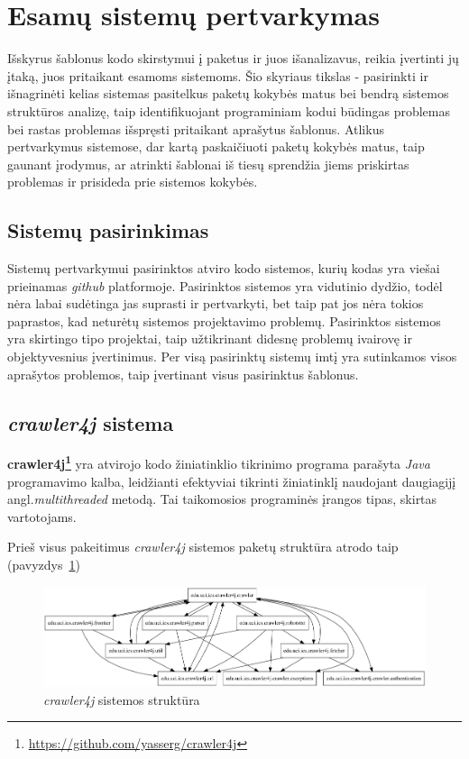 \section{Esamų sistemų pertvarkymas}
Išskyrus šablonus kodo skirstymui į paketus ir juos išanalizavus, reikia įvertinti jų įtaką, juos pritaikant esamoms sistemoms.
Šio skyriaus tikslas - pasirinkti ir išnagrinėti kelias sistemas pasitelkus paketų kokybės matus bei bendrą sistemos struktūros analizę,
taip identifikuojant programiniam kodui būdingas problemas bei rastas problemas išspręsti pritaikant aprašytus šablonus.
Atlikus pertvarkymus sistemose, dar kartą paskaičiuoti paketų kokybės matus,
taip gaunant įrodymus, ar atrinkti šablonai iš tiesų sprendžia
jiems priskirtas problemas ir prisideda prie sistemos kokybės.


\subsection{Sistemų pasirinkimas}
Sistemų pertvarkymui pasirinktos atviro kodo sistemos, kurių kodas yra viešai prieinamas \textit{github} platformoje.
Pasirinktos sistemos yra vidutinio dydžio, todėl nėra labai sudėtinga jas suprasti ir pertvarkyti, bet taip pat jos nėra
tokios paprastos, kad neturėtų sistemos projektavimo problemų.
Pasirinktos sistemos yra skirtingo tipo projektai, taip užtikrinant didesnę problemų ivairovę ir objektyvesnius įvertinimus.
Per visą pasirinktų sistemų imtį yra sutinkamos visos aprašytos problemos, taip įvertinant visus pasirinktus šablonus.

\subsection{\textit{crawler4j} sistema}
\textbf{crawler4j\footnote{\url{https://github.com/yasserg/crawler4j}}} yra atvirojo kodo
žiniatinklio tikrinimo  programa parašyta \textit{Java} programavimo kalba, leidžianti
efektyviai tikrinti žiniatinklį naudojant daugiagijį angl.\textit{multithreaded} metodą.
Tai taikomosios programinės įrangos tipas, skirtas vartotojams.

Prieš visus pakeitimus \textit{crawler4j} sistemos paketų struktūra atrodo taip (pavyzdys~\ref{fig:crawler_packages_orig})
\begin{figure}[H]
    \centering
    \includegraphics[scale=0.5]{img/crawler_packages_orig}
    \caption{\textit{crawler4j} sistemos struktūra}
    \label{fig:crawler_packages_orig}
\end{figure}

